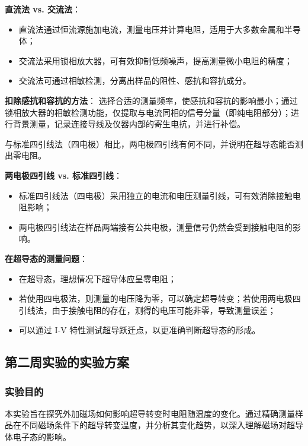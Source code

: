 \textbf{直流法 vs. 交流法}：
\begin{itemize}
    \item 直流法通过恒流源施加电流，测量电压并计算电阻，适用于大多数金属和半导体；
    \item 交流法采用锁相放大器，可有效抑制低频噪声，提高测量微小电阻的精度；
    \item 交流法可通过相敏检测，分离出样品的阻性、感抗和容抗成分。
\end{itemize}

\textbf{扣除感抗和容抗的方法}：
选择合适的测量频率，使感抗和容抗的影响最小；通过锁相放大器的相敏检测功能，仅提取与电流同相的信号分量（即纯电阻部分）；进行背景测量，记录连接导线及仪器内部的寄生电抗，并进行补偿。



\begin{question}
    与标准四引线法（四电极）相比，两电极四引线有何不同，并说明在超导态能否测出零电阻。
\end{question}

\textbf{两电极四引线 vs. 标准四引线}：
\begin{itemize}
    \item 标准四引线法（四电极）采用独立的电流和电压测量引线，可有效消除接触电阻影响；
    \item 两电极四引线法在样品两端接有公共电极，测量信号仍然会受到接触电阻的影响。
\end{itemize}

\textbf{在超导态的测量问题}：
\begin{itemize}
    \item 在超导态，理想情况下超导体应呈零电阻；
    \item 若使用四电极法，则测量的电压降为零，可以确定超导转变；若使用两电极四引线法，由于接触电阻的存在，测得的电压可能非零，导致测量误差；
    \item 可以通过 I-V 特性测试超导跃迁点，以更准确判断超导态的形成。
\end{itemize}




\subsection{第二周实验的实验方案}
\subsubsection{实验目的}
本实验旨在探究外加磁场如何影响超导转变时电阻随温度的变化。通过精确测量样品在不同磁场条件下的超导转变温度，并分析其变化趋势，以深入理解磁场对超导体电子态的影响。

